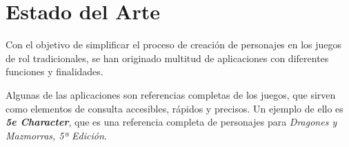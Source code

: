 

\section{Estado del Arte} \label{Estado_Arte}
Con el objetivo de simplificar el proceso de creación de personajes en los juegos de rol tradicionales, se han originado 
multitud de aplicaciones con diferentes funciones y finalidades. \medskip

Algunas de las aplicaciones son referencias completas de los juegos, que sirven como elementos de consulta accesibles, 
rápidos y precisos. Un ejemplo de ello es \textit{\textbf{5e Character}}, que es una referencia completa de personajes 
para \textit{Dragones y Mazmorras, 5ª Edición}.\vspace{1cm}

